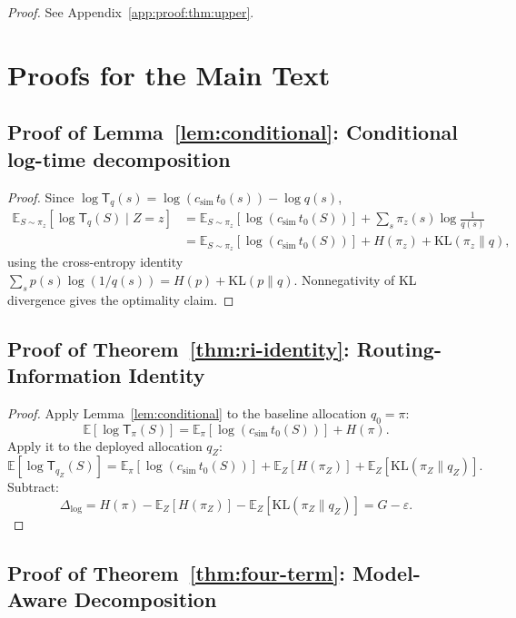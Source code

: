 \documentclass[10pt]{article}
\theoremstyle{paperplain}
\theoremstyle{paperdefinition}
\theoremstyle{paperremark}
\newcommand{\KL}{\mathrm{KL}}
\newcommand{\E}{\mathbb{E}}
\newcommand{\Dlog}{\Delta_{\log}}
\begin{document}
\par\noindent\emph{Proof.} See Appendix~\ref{app:proof:thm:upper}.\par



\section{Proofs for the Main Text}
\label{app:main-proofs}

\subsection{Proof of Lemma~\ref{lem:conditional}: Conditional log-time decomposition}
\label{app:proof:lem:conditional}

\begin{proof}
Since $\log \mathsf{T}_q(s) = \log(c_{\mathrm{sim}}\, t_0(s)) - \log q(s)$,
\[
\begin{aligned}
\E_{S \sim \pi_z}\!\left[\log \mathsf{T}_q(S) \mid Z=z\right]
&= \E_{S\sim\pi_z}[\log(c_{\mathrm{sim}}\, t_0(S))]
   + \sum_s \pi_z(s) \log \frac{1}{q(s)} \\
&= \E_{S\sim\pi_z}[\log(c_{\mathrm{sim}}\, t_0(S))]
   + H(\pi_z) + \KL(\pi_z \| q),
\end{aligned}
\]
using the cross-entropy identity $\sum_s p(s)\log(1/q(s)) = H(p) + \KL(p\|q)$.
Nonnegativity of KL divergence gives the optimality claim.
\end{proof}

\subsection{Proof of Theorem~\ref{thm:ri-identity}: Routing-Information Identity}
\label{app:proof:thm:ri-identity}

\begin{proof}
Apply Lemma~\ref{lem:conditional} to the baseline allocation $q_0 = \pi$:
\[
\E\!\left[\log \mathsf{T}_\pi(S)\right]
= \E_\pi[\log(c_{\mathrm{sim}}\, t_0(S))] + H(\pi).
\]
Apply it to the deployed allocation $q_Z$:
\[
\E\!\left[\log \mathsf{T}_{q_Z}(S)\right]
= \E_\pi[\log(c_{\mathrm{sim}}\, t_0(S))] + \E_Z[H(\pi_Z)] + \E_Z[\KL(\pi_Z \| q_Z)].
\]
Subtract:
\[
\Dlog = H(\pi) - \E_Z[H(\pi_Z)] - \E_Z[\KL(\pi_Z \| q_Z)]
= G - \varepsilon.
\]
\end{proof}

\subsection{Proof of Theorem~\ref{thm:four-term}: Model-Aware Decomposition}
\label{app:proof:thm:four-term}
\end{document}
